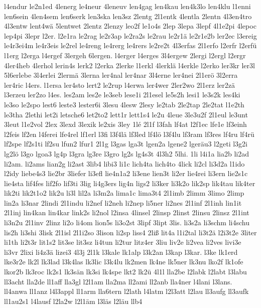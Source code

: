 {l4endur
le2n1ed
4lenerg
le4neur
4leneuv
len4gag
len4kau
len4k3lo
len4klu
l1enni
len6sein
4len4sem
len6serk
len3ska
len3sz
2lentg
2l1entk
4lentla
2lentn
4l3en4tro
4l3entw
lent4wä
5lentwet
2lentz
2lenzy
leo2f
le1o4s
2lep
3lepa
3lepf
4l1e2pi
4lepoc
lep4pi
3lepr
l2er.
l2e1ra
le2rag
le2r3ap
le2ra2s
le2rau
le2r1ä
le2r1e2b
ler2ec
l3ereig
le4r3ei4m
le4r3eis
le2rel
le4reng
le4rerg
le4rers
le2re2t
4l3erfas
2l1erfo
l2erfr
l2erfü
l1erg
l2erga
l4ergef
3lergeh
6lergen.
l4erger
l4erges
3l4ergew
2lergi
l2ergl
l2ergr
4ler4heb
4lerhol
lerin4s
lerk2
l2erka
2lerke
l1erkl
4lerklä
l4erkle
l2erko
ler3kr
ler3l
5l6erlebe
3l4erlei
2lermä
3lerna
ler4nal
ler4nar
3l4erne
ler4nei
2l1erö
3l2erra
ler4ric
l4ers.
l1ersa
ler4sto
lert2
le2rup
l4erwa
ler4wer
2ler2wo
2l1erz
ler2zä
l3erzeu
ler2zo
l4es.
les2am
les2e
le3seb
lese1i
2l1esel
le5s2h
lesi1
le3s2k
les4ki
le3so
le2spo
lest6
leste3
lester6i
3lesu
4lesw
2lesy
le2tab
2le2tap
2le2tat
l1e2th
le3tha
2lethi
let2i
letsche6
let2to2
lett1r
lett1s4
le2u
4leue
3le3u2f
2l1eul
le3unt
3leut
l1e2vol
2lex
3lexd
3lexik
le2xis
3ley
1lé
2l1f
l3fah
lf4at
l2f1ec
lfe1e
lf3einh
l2feis
lf2en
l4ferei
lfe4rel
lf1erl
l3fi
l3f4lä
lf3led
lf4lö
l3f4lu
lf3ram
lf3res
lf4ru
lf4rü
lf2spe
lf2s1ti
lf2su
lfun2
lfur1
2l1g
l3gas
lga3t
lgen2a
lgene2
lgeräu3
l2geti
l3g2i
lg2lö
l3go
lgoa3
lg4p
l3gra
lg3re
l3gro
lg2s
lg4s3t
4l3h2
5lhi.
1li
l4i1a
lia2b
li2ad
li2am.
li2ams
lian2g
li2ast
3lib4
libi3
li1c
lich4ta
lich4to
4lick
li2cl
li3d2a
l1ido
l2idy
liebe4s3
lie2br
3liefer
li3efl
lie4n1a2
li3ene
lien3t
li2er
lie4rei
li3ern
lie2s1c
lie4sta
lif4fes
lif2fo
lif3ti
3lig
li4g3ers
lig4n
ligs2
li3ker
li3k2o
lik2sp
lik4tau
lik4ter
lik2ti
lik2t1o2
lik2u
li3l
lil2a
li3m2a
lima1c
lima3t4
2l1imb
2limm
3limo
2limp
lin2a
li3nar
2lindi
2l1indu
li2nef
li2neh
li2nep
li5ner
li2nes
2l1inf
2l1inh
lin1it
2l1inj
lin4kan
lin4kar
link2s
li2nol
l2insa
4linsel
2linsp
2linst
2linsu
2linsz
2l1int
li3n2u
2l1inv
2linz
li2o
li4om
lion5s
li3o2st
3lipf
3lipt
3lis.
li3s2a
li3schm
li4schu
lis2h
li3shi
3lisk
2l1isl
2l1i2so
3lison
li2sp
liss4
2liß
lit4a
l1i2tal
li3t2ä
l2i3t2e
3liter
li1th
li2t3r
lit1s2
lit3se
lit3sz
li4tun
li2tur
litz4er
3liu
liv2e
li2vea
li2ves
livi3e
li3vr
2lixi
li4z3ä
lizei3
4l3j
2l1k
l3kale
lk1alp
l3k2an
l3kap
l3kar.
l3ke
lk1erd
lke3r2e
lk2l
lk3lad
l3k4las
lk3lic
l3k4lu
lk2men
lk4ne
lk5ner
lk3nu
lko2f
lk1ofe
lkor2b
lk3roc
lk2s1
lk3sän
lk3si
lk4spe
lkt2
lk2ü
4l1l
lla2be
l2labk
l2labt
l3labu
ll3acht
lla2de
ll1aff
lla3gl
l2l1am
lla2ma
ll2ami
ll2anb
lla4ner
l4lani
l3lans.
ll4anwa
ll1anz
l4l3appl
ll1arm
lla6tern
l2lath
l4latm
l2l3att
l2lau
ll3aufg
ll3aufk
ll1au2s1
l4lausf
l2la2w
l2l1äm
l3läs
l2läu
llb4
}
